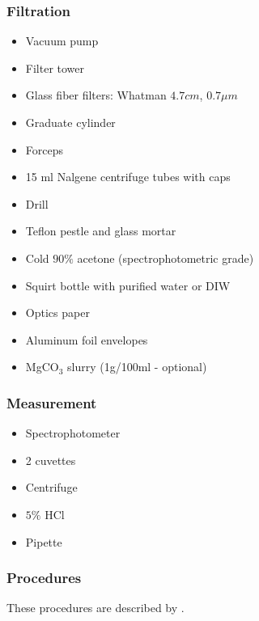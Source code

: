 \begin{appendices}
\begin{multicols}{2}
\subsubsection*{Filtration}
\begin{itemize}[itemsep=0.01cm,leftmargin=*]
  \item Vacuum pump
  \item Filter tower
  \item Glass fiber filters: Whatman $4.7cm$, $0.7\mu m$
  \item Graduate cylinder
  \item Forceps
  \item 15 ml Nalgene centrifuge tubes with caps
  \item Drill
  \item Teflon pestle and glass mortar
  \item Cold $90\%$ acetone (spectrophotometric grade)
  \item Squirt bottle with purified water or DIW
  \item Optics paper
  \item Aluminum foil envelopes
  \item MgCO$_3$ slurry (1g/100ml - optional)
\end{itemize}
\subsubsection*{Measurement}
\begin{itemize}[itemsep=0.01cm,leftmargin=*]
  \item Spectrophotometer
  \item 2 cuvettes
  \item Centrifuge
  \item $5\%$ HCl
  \item Pipette

\end{itemize}
\end{multicols}
\subsubsection{Procedures}
These procedures are described by \citet{Tyler2013_chl_protocol}.

\end{appendices}
